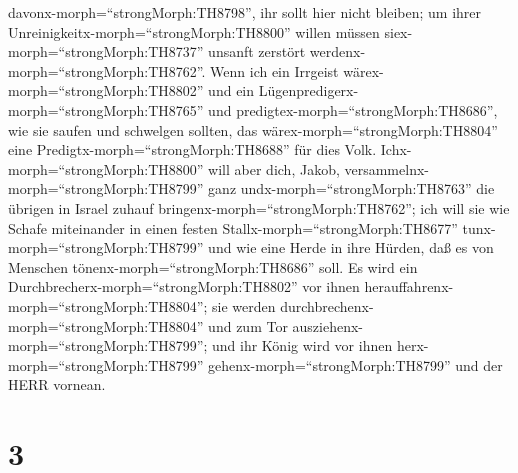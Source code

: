 davonx-morph=``strongMorph:TH8798'', ihr sollt hier nicht bleiben; um
ihrer Unreinigkeitx-morph=``strongMorph:TH8800'' willen müssen
siex-morph=``strongMorph:TH8737'' unsanft zerstört
werdenx-morph=``strongMorph:TH8762''.  Wenn ich ein
Irrgeist wärex-morph=``strongMorph:TH8802'' und ein
Lügenpredigerx-morph=``strongMorph:TH8765'' und
predigtex-morph=``strongMorph:TH8686'', wie sie saufen und schwelgen
sollten, das wärex-morph=``strongMorph:TH8804'' eine
Predigtx-morph=``strongMorph:TH8688'' für dies Volk. 
Ichx-morph=``strongMorph:TH8800'' will aber dich, Jakob,
versammelnx-morph=``strongMorph:TH8799'' ganz
undx-morph=``strongMorph:TH8763'' die übrigen in Israel zuhauf
bringenx-morph=``strongMorph:TH8762''; ich will sie wie Schafe
miteinander in einen festen Stallx-morph=``strongMorph:TH8677''
tunx-morph=``strongMorph:TH8799'' und wie eine Herde in ihre Hürden, daß
es von Menschen tönenx-morph=``strongMorph:TH8686'' soll. 
Es wird ein Durchbrecherx-morph=``strongMorph:TH8802'' vor ihnen
herauffahrenx-morph=``strongMorph:TH8804''; sie werden
durchbrechenx-morph=``strongMorph:TH8804'' und zum Tor
ausziehenx-morph=``strongMorph:TH8799''; und ihr König wird vor ihnen
herx-morph=``strongMorph:TH8799'' gehenx-morph=``strongMorph:TH8799''
und der HERR vornean.

\hypertarget{section-2}{%
\section{3}\label{section-2}}


